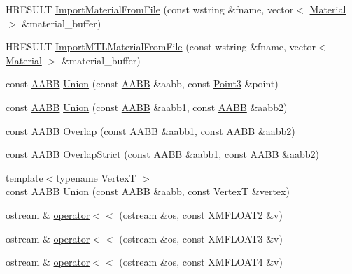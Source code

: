 \begin{DoxyCompactItemize}
\item 
H\+R\+E\+S\+U\+LT \hyperlink{namespacemage_a3dd35a33d61f2891a717b5958f7edf12}{Import\+Material\+From\+File} (const wstring \&fname, vector$<$ \hyperlink{structmage_1_1_material}{Material} $>$ \&material\+\_\+buffer)
\item 
H\+R\+E\+S\+U\+LT \hyperlink{namespacemage_a7d8de4109ffc72a7a320e4ec642bddef}{Import\+M\+T\+L\+Material\+From\+File} (const wstring \&fname, vector$<$ \hyperlink{structmage_1_1_material}{Material} $>$ \&material\+\_\+buffer)
\item 
const \hyperlink{structmage_1_1_a_a_b_b}{A\+A\+BB} \hyperlink{namespacemage_a4d27bf7b1b0d30b747cdec1326e80907}{Union} (const \hyperlink{structmage_1_1_a_a_b_b}{A\+A\+BB} \&aabb, const \hyperlink{structmage_1_1_point3}{Point3} \&point)
\item 
const \hyperlink{structmage_1_1_a_a_b_b}{A\+A\+BB} \hyperlink{namespacemage_a14f2c20e37511b983bcb731afbb6b0b6}{Union} (const \hyperlink{structmage_1_1_a_a_b_b}{A\+A\+BB} \&aabb1, const \hyperlink{structmage_1_1_a_a_b_b}{A\+A\+BB} \&aabb2)
\item 
const \hyperlink{structmage_1_1_a_a_b_b}{A\+A\+BB} \hyperlink{namespacemage_ade79a277862009e505ce6c15ecd98cdf}{Overlap} (const \hyperlink{structmage_1_1_a_a_b_b}{A\+A\+BB} \&aabb1, const \hyperlink{structmage_1_1_a_a_b_b}{A\+A\+BB} \&aabb2)
\item 
const \hyperlink{structmage_1_1_a_a_b_b}{A\+A\+BB} \hyperlink{namespacemage_a31fba0978e5da37928e5eec83a4f784d}{Overlap\+Strict} (const \hyperlink{structmage_1_1_a_a_b_b}{A\+A\+BB} \&aabb1, const \hyperlink{structmage_1_1_a_a_b_b}{A\+A\+BB} \&aabb2)
\item 
{\footnotesize template$<$typename VertexT $>$ }\\const \hyperlink{structmage_1_1_a_a_b_b}{A\+A\+BB} \hyperlink{namespacemage_aa727c025f86c9da2b6704c5f40b3d700}{Union} (const \hyperlink{structmage_1_1_a_a_b_b}{A\+A\+BB} \&aabb, const VertexT \&vertex)
\item 
ostream \& \hyperlink{namespacemage_ac348ad49bf7e9912aa70cda1b0ca553d}{operator$<$$<$} (ostream \&os, const X\+M\+F\+L\+O\+A\+T2 \&v)
\item 
ostream \& \hyperlink{namespacemage_a44b2d3046802608544402245919f219b}{operator$<$$<$} (ostream \&os, const X\+M\+F\+L\+O\+A\+T3 \&v)
\item 
ostream \& \hyperlink{namespacemage_af6c1d1c5718d611450932bde30d2bfef}{operator$<$$<$} (ostream \&os, const X\+M\+F\+L\+O\+A\+T4 \&v)
\item 

\end{DoxyCompactItemize}

